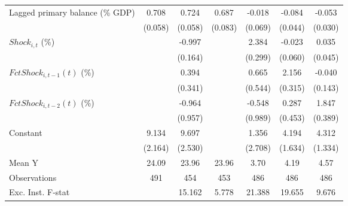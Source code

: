 {\begin{tabular}{l*{6}{c}}
\addlinespace
Lagged primary balance (\% GDP)&       0.708\sym{***}&       0.724\sym{***}&       0.687\sym{***}&      -0.018         &      -0.084\sym{*}  &      -0.053\sym{*}  \\
                    &     (0.058)         &     (0.058)         &     (0.083)         &     (0.069)         &     (0.044)         &     (0.030)         \\
\addlinespace
$ Shock_{i,t}$ (\%) &                     &      -0.997\sym{***}&                     &       2.384\sym{***}&      -0.023         &       0.035         \\
                    &                     &     (0.164)         &                     &     (0.299)         &     (0.060)         &     (0.045)         \\
\addlinespace
$ FctShock_{i,t-1}(t)$ (\%)&                     &       0.394         &                     &       0.665         &       2.156\sym{***}&      -0.040         \\
                    &                     &     (0.341)         &                     &     (0.544)         &     (0.315)         &     (0.143)         \\
\addlinespace
$ FctShock_{i,t-2}(t)$ (\%)&                     &      -0.964         &                     &      -0.548         &       0.287         &       1.847\sym{***}\\
                    &                     &     (0.957)         &                     &     (0.989)         &     (0.453)         &     (0.389)         \\
\addlinespace
Constant            &       9.134\sym{***}&       9.697\sym{***}&                     &       1.356         &       4.194\sym{**} &       4.312\sym{***}\\
                    &     (2.164)         &     (2.530)         &                     &     (2.708)         &     (1.634)         &     (1.334)         \\
\midrule
Mean Y              &       24.09         &       23.96         &       23.96         &        3.70         &        4.19         &        4.57         \\
Observations        &         491         &         454         &         453         &         486         &         486         &         486         \\
Exc. Inst. F-stat   &                     &      15.162         &       5.778         &      21.388         &      19.655         &       9.676         \\
\bottomrule
\end{tabular}
}
